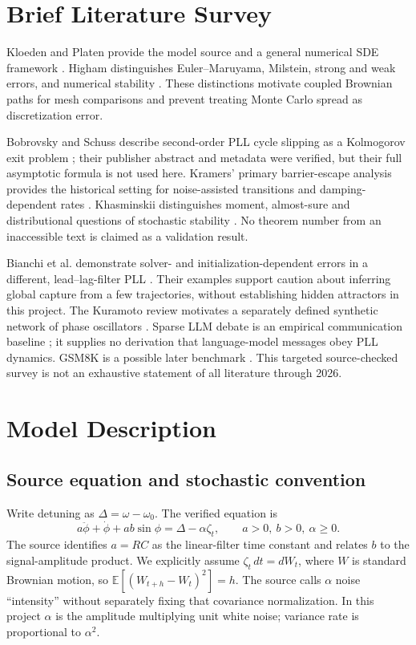 \documentclass[11pt,a4paper]{article}
\begin{document}
\section{Brief Literature Survey}
Kloeden and Platen provide the model source and a general numerical SDE framework \cite{kloeden1992}. Higham distinguishes Euler--Maruyama, Milstein, strong and weak errors, and numerical stability \cite{higham2001}. These distinctions motivate coupled Brownian paths for mesh comparisons and prevent treating Monte Carlo spread as discretization error.

Bobrovsky and Schuss describe second-order PLL cycle slipping as a Kolmogorov exit problem \cite{bobrovsky1982}; their publisher abstract and metadata were verified, but their full asymptotic formula is not used here. Kramers' primary barrier-escape analysis provides the historical setting for noise-assisted transitions and damping-dependent rates \cite{kramers1940}. Khasminskii distinguishes moment, almost-sure and distributional questions of stochastic stability \cite{khasminskii2012}. No theorem number from an inaccessible text is claimed as a validation result.

Bianchi et al. demonstrate solver- and initialization-dependent errors in a different, lead--lag-filter PLL \cite{bianchi2015}. Their examples support caution about inferring global capture from a few trajectories, without establishing hidden attractors in this project. The Kuramoto review motivates a separately defined synthetic network of phase oscillators \cite{acebron2005}. Sparse LLM debate is an empirical communication baseline \cite{li2024}; it supplies no derivation that language-model messages obey PLL dynamics. GSM8K is a possible later benchmark \cite{cobbe2021,gsm8krepository}. This targeted source-checked survey is not an exhaustive statement of all literature through 2026.

\section{Model Description}
\subsection{Source equation and stochastic convention}
Write detuning as $\Delta=\omega-\omega_0$. The verified equation is
\begin{equation}
a\ddot\phi+\dot\phi+ab\sin\phi=\Delta-\alpha\zeta_t,
\qquad a>0,\ b>0,\ \alpha\ge0.
\label{eq:second}
\end{equation}
The source identifies $a=RC$ as the linear-filter time constant and relates $b$ to the signal-amplitude product. We explicitly assume $\zeta_t\,dt=dW_t$, where $W$ is standard Brownian motion, so $\mathbb E[(W_{t+h}-W_t)^2]=h$. The source calls $\alpha$ noise ``intensity'' without separately fixing that covariance normalization. In this project $\alpha$ is the amplitude multiplying unit white noise; variance rate is proportional to $\alpha^2$.
\end{document}
